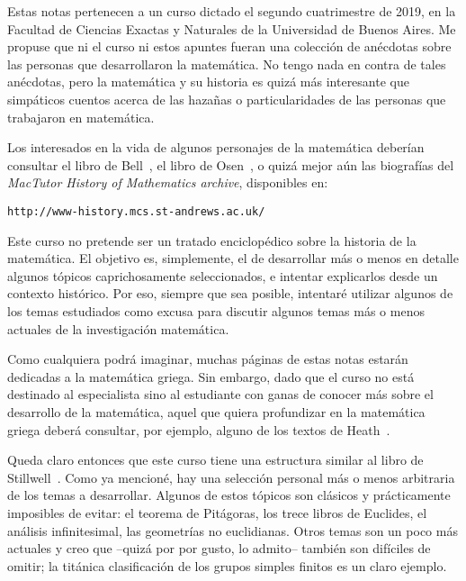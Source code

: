\preface

Estas notas pertenecen a un curso dictado el segundo cuatrimestre de 2019, en
la Facultad de Ciencias Exactas y Naturales de la Universidad de Buenos Aires.
Me propuse que ni el curso ni estos apuntes fueran una colección
de anécdotas sobre las personas que desarrollaron la matemática. No tengo nada
en contra de tales anécdotas, pero la matemática y su historia es quizá 
más interesante que simpáticos cuentos acerca de las hazañas o particularidades
de las personas que trabajaron en matemática.

Los interesados en la vida de algunos personajes de la matemática deberían
consultar el libro de Bell~\cite{MR3728304}, el libro de Osen~\cite{MR0497806},
o quizá mejor aún las biografías del \emph{MacTutor History of Mathematics
archive}, disponibles en:

\begin{center}
\verb+http://www-history.mcs.st-andrews.ac.uk/+
\end{center}

Este curso no pretende ser un tratado enciclopédico sobre la historia de la
matemática. El objetivo es, simplemente, el de desarrollar más o menos en detalle algunos tópicos  
caprichosamente seleccionados, e intentar explicarlos desde un contexto
histórico. Por eso, siempre que sea posible, intentaré utilizar algunos de los 
temas estudiados como excusa para discutir  
algunos temas más o menos actuales de la investigación matemática. 

Como cualquiera podrá imaginar, muchas páginas de estas notas estarán dedicadas a la matemática
griega. Sin embargo, dado que el curso no está destinado al especialista sino 
al estudiante con ganas de conocer más sobre el desarrollo de la matemática, 
aquel que quiera profundizar en la matemática griega 
deberá consultar, por ejemplo, alguno de los textos de Heath~\cite{MR654679,
MR654680,MR0156760}. 

Queda claro entonces que este curso tiene una estructura similar al libro de
Stillwell~\cite{MR2667826}.  Como ya mencioné, hay una selección personal 
más o menos arbitraria
de los temas a desarrollar. Algunos de estos tópicos son clásicos y
prácticamente imposibles de evitar: el teorema de Pitágoras, los trece libros
de Euclides, el análisis infinitesimal, las geometrías no euclidianas. Otros
temas son un poco más actuales y creo que --quizá por por gusto, lo admito-- 
también son difíciles de omitir; la titánica 
clasificación de los grupos simples finitos
es un claro ejemplo.

